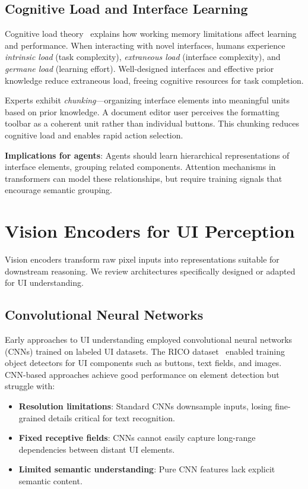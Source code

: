 \documentclass[11pt]{article}
\begin{document}
\subsection{Cognitive Load and Interface Learning}

Cognitive load theory~\cite{sweller1988} explains how working memory limitations affect learning and performance. When interacting with novel interfaces, humans experience \textit{intrinsic load} (task complexity), \textit{extraneous load} (interface complexity), and \textit{germane load} (learning effort). Well-designed interfaces and effective prior knowledge reduce extraneous load, freeing cognitive resources for task completion.

Experts exhibit \textit{chunking}---organizing interface elements into meaningful units based on prior knowledge. A document editor user perceives the formatting toolbar as a coherent unit rather than individual buttons. This chunking reduces cognitive load and enables rapid action selection.

\textbf{Implications for agents}: Agents should learn hierarchical representations of interface elements, grouping related components. Attention mechanisms in transformers can model these relationships, but require training signals that encourage semantic grouping.

\section{Vision Encoders for UI Perception}
\label{sec:vision}

Vision encoders transform raw pixel inputs into representations suitable for downstream reasoning. We review architectures specifically designed or adapted for UI understanding.

\subsection{Convolutional Neural Networks}

Early approaches to UI understanding employed convolutional neural networks (CNNs) trained on labeled UI datasets. The RICO dataset~\cite{rico2017} enabled training object detectors for UI components such as buttons, text fields, and images. CNN-based approaches achieve good performance on element detection but struggle with:

\begin{itemize}
    \item \textbf{Resolution limitations}: Standard CNNs downsample inputs, losing fine-grained details critical for text recognition.
    \item \textbf{Fixed receptive fields}: CNNs cannot easily capture long-range dependencies between distant UI elements.
    \item \textbf{Limited semantic understanding}: Pure CNN features lack explicit semantic content.
\end{itemize}
\end{document}
